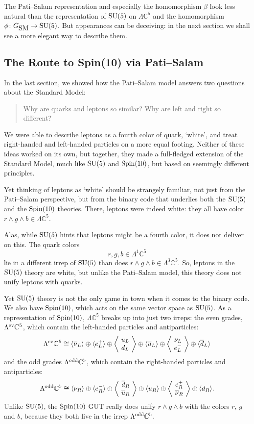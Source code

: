\documentclass[12pt]{article}
\newcommand{\maps}{\colon}    %
\newcommand{\C}{{\mathbb C}}  %
\newcommand{\SU}{{\rm SU}}    %
\newcommand{\Spin}{{\rm Spin}}    %
\newcommand{\Ex}{\Lambda} %
\newcommand{\Exev}{\Lambda^{\rm ev}} %
\newcommand{\Exodd}{\Lambda^{\rm odd}} %
\newcommand{\iso}{\cong} %
\newcommand{\GSM}{{G_{\mbox{\rm SM}}}}  %
\newcommand{\ubar}{\overline{u}} %
\newcommand{\dbar}{\overline{d}} %
\newcommand{\nubar}{\overline{\nu}} %
\newcommand{\anglep}{\left\langle \! \begin{array}{c} \nu_L \\ e^-_L \end{array} \! \right\rangle} %
\newcommand{\angantilep}{\left\langle \! \begin{array}{c} e^+_R \\ \nubar_R \end{array} \! \right\rangle} %
\newcommand{\angquark}{\left\langle \! \begin{array}{c} u_L \\ d_L \end{array} \! \right\rangle} %
\newcommand{\angantiquark}{\left\langle \! \begin{array}{c} \dbar_R \\ \ubar_R \end{array} \! \right\rangle} %
\begin{document}
The Pati--Salam representation and especially the homomorphism
$\beta$ look less natural than the representation of $\SU(5)$ on 
$\Lambda \C^5$ and the homomorphism $\phi \maps \GSM \to \SU(5)$.  
But appearances can be deceiving: in the next section we shall see 
a more elegant way to describe them.

\subsection{The Route to Spin(10) via Pati--Salam} \label{sec:route}

In the last section, we showed how the Pati--Salam model answers two questions
about the Standard Model:

\begin{quote}
	Why are quarks and leptons so similar?  Why are left and right so
	different?
\end{quote}

We were able to describe leptons as a fourth color of quark, `white', and
treat right-handed and left-handed particles on a more equal footing.
Neither of these ideas worked on its own, but together, they made
a full-fledged extension of the Standard Model, much like $\SU(5)$ and
$\Spin(10)$, but based on seemingly different principles.

Yet thinking of leptons as `white' should be strangely familiar, not
just from the Pati--Salam perspective, but
from the binary code that underlies both the $\SU(5)$ and the
$\Spin(10)$ theories. There, leptons were indeed white: they all have
color $r \wedge g \wedge b \in \Ex \C^5$.

Alas, while $\SU(5)$ hints that leptons might be a fourth color, it does not
deliver on this. The quark colors 
\[ r, g, b \in \Ex^1 \C^5 \]
lie in a different irrep of $\SU(5)$ than does $r \wedge g \wedge b \in \Ex^3
\C^5$.  So, leptons in the $\SU(5)$ theory are white, but unlike
the Pati--Salam model, this theory
does not unify leptons with quarks.

Yet $\SU(5)$ theory is not the only game in town when it comes to the binary
code. We also have $\Spin(10)$, which acts on the same vector space as
$\SU(5)$. As a representation of $\Spin(10)$, $\Ex \C^5$ breaks up into just
two irreps: the even grades, $\Exev \C^5$, which contain the left-handed
particles and antiparticles:
\[ \Exev \C^5 \iso \langle \nubar_L \rangle \oplus \langle e^+_L \rangle \oplus \angquark \oplus \langle \ubar_L \rangle \oplus \anglep \oplus \langle \dbar_L \rangle \]
and the odd grades $\Exodd \C^5$, which contain the right-handed particles and
antiparticles:
\[ \Exodd \C^5 \iso \langle \nu_R \rangle \oplus \langle e^-_R \rangle \oplus \angantiquark \oplus \langle u_R \rangle \oplus \angantilep \oplus \langle d_R \rangle.
\]
Unlike $\SU(5)$, the $\Spin(10)$ GUT really does unify 
$r \wedge g \wedge b$ with the colors $r$, $g$ and $b$, because they 
both live in the irrep $\Exodd \C^5$. 
\end{document}
